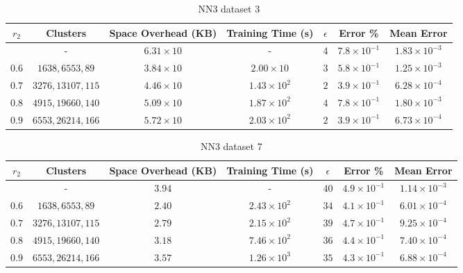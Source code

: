 \begin{adjustwidth}{-1.5cm}{}
\begin{table}
\caption{NN3 dataset 3}\label{ws33}
\begin{tabular}{ccccccc}
\hline
\toprule
$r_2$ & Clusters & Space Overhead (KB) & Training Time (s) & $\epsilon$ & Error \% & Mean Error\\
\midrule
 & - & $6.31 \times 10$ & - & $4$ & $7.8 \times 10^{-1}$ & $1.83 \times 10^{-3}$\\
$0.6$ & $1638, 6553, 89$ & $3.84 \times 10$ & $2.00 \times 10$ & $3$ & $5.8 \times 10^{-1}$ & $1.25 \times 10^{-3}$\\
$0.7$ & $3276, 13107, 115$ & $4.46 \times 10$ & $1.43 \times 10^2$ & $2$ & $3.9 \times 10^{-1}$ & $6.28 \times 10^{-4}$\\
$0.8$ & $4915, 19660, 140$ & $5.09 \times 10$ & $1.87 \times 10^2$ & $4$ & $7.8 \times 10^{-1}$ & $1.80 \times 10^{-3}$\\
$0.9$ & $6553, 26214, 166$ & $5.72 \times 10$ & $2.03 \times 10^2$ & $2$ & $3.9 \times 10^{-1}$ & $6.73 \times 10^{-4}$\\
\bottomrule
\end{tabular}
\end{table}
\end{adjustwidth}

\begin{adjustwidth}{-1.5cm}{}
\begin{table}
\caption{NN3 dataset 7}\label{ws37}
\begin{tabular}{ccccccc}
\hline
\toprule
$r_2$ & Clusters & Space Overhead (KB) & Training Time (s) & $\epsilon$ & Error \% & Mean Error\\
\midrule
& - & $3.94$ & - & $40$ & $4.9 \times 10^{-1}$ & $1.14 \times 10^{-3}$\\
$0.6$ & $1638, 6553, 89$ & $2.40$ & $2.43 \times 10^2$ & $34$ & $4.1 \times 10^{-1}$ & $6.01 \times 10^{-4}$\\
$0.7$ & $3276, 13107, 115$ & $2.79$ & $2.15 \times 10^2$ & $39$ & $4.7 \times 10^{-1}$ & $9.25 \times 10^{-4}$\\
$0.8$ & $4915, 19660, 140$ & $3.18$ & $7.46 \times 10^2$ & $36$ & $4.4 \times 10^{-1}$ & $7.40 \times 10^{-4}$\\
$0.9$ & $6553, 26214, 166$ & $3.57$ & $1.26 \times 10^3$ & $35$ & $4.3 \times 10^{-1}$ & $6.88 \times 10^{-4}$\\
\bottomrule
\end{tabular}
\end{table}
\end{adjustwidth}

